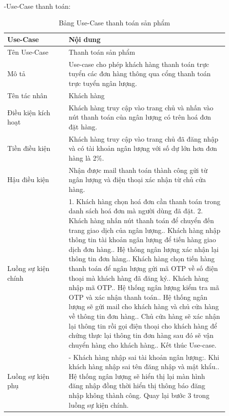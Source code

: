 -Use-Case thanh toán:
\begin{longtable}[htp]{ |m{0.25\linewidth}|m{0.65\linewidth}|}
 \caption{Bảng Use-Case thanh toán sản phẩm \label{long}}\\
 \hline
 Use-Case & Nội dung \\
 \hline
 Tên Use-Case & Thanh toán sản phẩm \\
 \hline
 Mô tả & Use-case cho phép khách hàng thanh toán trực tuyển các đơn hàng thông qua cổng thanh toán trực tuyển ngân lượng.\\
 \hline
 Tên tác nhân & Khách hàng\\
 \hline
 Điều kiện kích hoạt & Khách hàng truy cập vào trang chủ và nhấn vào nút thanh toán của ngân lượng có trên hoá đơn đặt hàng.\\
 \hline
 Tiền điều kiện & Khách hàng truy cập vào trang chủ đã đăng nhập và có tài khoản ngân lượng với số dự lớn hơn đơn hàng là 2\%.\\
 \hline
 Hậu điều kiện & Nhận được mail thanh toán thành công gửi từ ngân lượng và điện thoại xác nhận từ chủ cửa hàng.\\
 \hline
 Luồng sự kiện chính & 
  1. Khách hàng chọn hoá đơn cần thanh toán trong danh sách hoá đơn mà người dùng đã đặt.
  2. Khách hàng nhấn nút thanh toán để chuyển đến trang giao dịch của ngân lượng.\newline
  3. Khách hàng nhập thông tin tài khoản ngân lượng để tiến hàng giao dịch đơn hàng.\newline
  4. Hệ thông ngân lượng xác nhận lại thông tin đơn hàng.\newline
  5. Khách hàng chọn tiến hàng thanh toán để ngân lượng gửi mã OTP về số điện thoại mà khách hàng đã đăng ký.\newline
  6. Khách hàng nhập mã OTP.\newline 
  7. Hệ thống ngân lượng kiểm tra mã OTP và xác nhận thanh toán.\newline 
  8. Hệ thống ngân lượng sẽ gửi mail cho khách hàng và chủ cửa hàng về thông tin đơn hàng.\newline 
  9. Chủ cửa hàng sẽ xác nhận lại thông tin rồi gọi điện thoại cho khách hàng để chứng thực lại thông tin đơn hàng sau đó sẽ vận chuyển hàng cho khách hàng.\newline 
  5. Kết thúc Use-case.	\newline 
 \\
 \hline
 Luồng sự kiện phụ & 
 - Khách hàng nhập sai tài khoản ngân lượng:\newline
 1. Khi khách hàng nhập sai tên đăng nhập và mật khẩu.\newline
 2. Hệ thống ngân lượng sẽ hiển thị lại màn hình đăng nhập đồng thời hiển thị thông báo đăng nhập không thành công.\newline
  Quay lại bước 3 trong luồng sự kiện chính.
 \\
 \hline
\end{longtable}
\newpage
